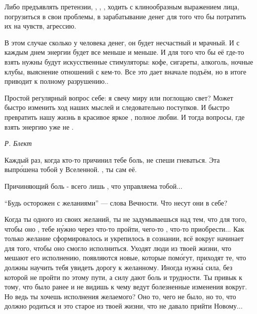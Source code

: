 Либо предъявлять претензии, , , , ходить с клинообразным выражением лица, погрузиться в свои проблемы, в зарабатывание денег для того что бы потратить их на  чувств,  агрессию.

В этом случае  сколько у человека денег, он будет несчастный и мрачный. И с каждым днем энергии будет все меньше и меньше. И для того что бы её где-то взять нужны будут искусственные стимуляторы: кофе, сигареты, алкоголь, ночные клубы, выяснение отношений с кем-то. Все это дает вначале подъём, но в итоге приводит к полному разрушению..

Простой регулярный вопрос себе: я свечу миру или поглощаю свет? Может быстро изменить ход наших мыслей и следовательно поступков. И быстро превратить нашу жизнь в красивое яркое , полное любви. И тогда вопросы, где взять энергию уже не .

\begin{flushright}
    \it Р. Блект
\end{flushright}


Каждый раз, когда кто-то причинил тебе боль, не спеши гневаться. Эта  выпр\'{о}шена тобой у Вселенной. , ты сам  её.

Причиняющий боль - всего лишь , что управляема тобой...

``Будь осторожен с желаниями'' --- слова Вечности. Что несут они в себе?

Когда ты   одного из своих желаний, ты не задумываешься над тем, что для того, чтобы оно , тебе н\'{у}жно через что-то пройти, чего-то , что-то приобрести... Как только желание сформировалось и укрепилось в сознании, всё вокруг начинает  для того, чтобы оно смогло исполниться. Уходят люди из твоей жизни, что мешают его исполнению, появляются новые, которые пом\'{о}гут, приходят те, что должны научить тебя увидеть дорогу к желанному. Иногда нужн\'{а} сила, без которой не пройти по этому пути, а силу дают боль и трудности. Ты привык к тому, что было ранее и не видишь к чему ведут болезненные изменения вокруг. Но ведь ты хочешь исполнения желаемого? Оно то, чего не было, но то, что должно родиться и это  старое из твоей жизни, что не давало прийти Новому...

